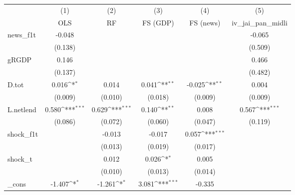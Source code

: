 {
\def\sym#1{\ifmmode^{#1}\else\(^{#1}\)\fi}
\begin{tabular}{l*{5}{c}}
\toprule
            &\multicolumn{1}{c}{(1)}&\multicolumn{1}{c}{(2)}&\multicolumn{1}{c}{(3)}&\multicolumn{1}{c}{(4)}&\multicolumn{1}{c}{(5)}\\
            &\multicolumn{1}{c}{OLS}&\multicolumn{1}{c}{RF}&\multicolumn{1}{c}{FS (GDP)}&\multicolumn{1}{c}{FS (news)}&\multicolumn{1}{c}{iv\_jai\_pan\_midli}\\
\midrule
news\_f1t    &      -0.048         &                     &                     &                     &      -0.065         \\
            &     (0.138)         &                     &                     &                     &     (0.509)         \\
\addlinespace
gRGDP       &       0.146         &                     &                     &                     &       0.466         \\
            &     (0.137)         &                     &                     &                     &     (0.482)         \\
\addlinespace
D.tot       &       0.016\sym{*}  &       0.014         &       0.041\sym{**} &      -0.025\sym{**} &       0.004         \\
            &     (0.009)         &     (0.010)         &     (0.018)         &     (0.009)         &     (0.009)         \\
\addlinespace
L.netlend   &       0.580\sym{***}&       0.629\sym{***}&       0.140\sym{**} &       0.008         &       0.567\sym{***}\\
            &     (0.086)         &     (0.072)         &     (0.060)         &     (0.047)         &     (0.119)         \\
\addlinespace
shock\_f1t   &                     &      -0.013         &      -0.017         &       0.057\sym{***}&                     \\
            &                     &     (0.013)         &     (0.019)         &     (0.017)         &                     \\
\addlinespace
shock\_t     &                     &       0.012         &       0.026\sym{*}  &       0.005         &                     \\
            &                     &     (0.010)         &     (0.013)         &     (0.014)         &                     \\
\addlinespace
\_cons      &      -1.407\sym{*}  &      -1.261\sym{*}  &       3.081\sym{***}&      -0.335         &                     \\

\end{tabular}}
